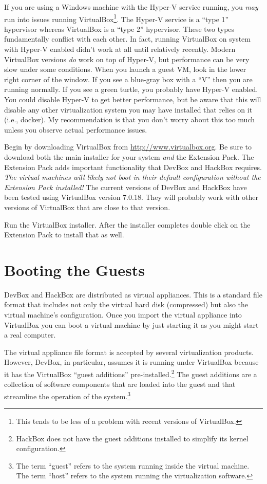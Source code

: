 \documentclass[twocolumn]{article}
\begin{document}
If you are using a Windows machine with the Hyper-V service running, you \emph{may} run into
issues running VirtualBox\footnote{This tends to be less of a problem with recent versions of
VirtualBox.}. The Hyper-V service is a ``type 1'' hypervisor whereas VirtualBox is a ``type 2''
hypervisor. These two types fundamentally conflict with each other. In fact, running VirtualBox
on system with Hyper-V enabled didn't work at all until relatively recently. Modern VirtualBox
versions \emph{do} work on top of Hyper-V, but performance can be very slow under some
conditions. When you launch a guest VM, look in the lower right corner of the window. If you see
a blue-gray box with a ``V'' then you are running normally. If you see a green turtle, you
probably have Hyper-V enabled. You could disable Hyper-V to get better performance, but be aware
that this will disable any other virtualization system you may have installed that relies on it
(i.e., docker). My recommendation is that you don't worry about this too much unless you observe
actual performance issues.

Begin by downloading VirtualBox from \url{http://www.virtualbox.org}. Be sure to download both
the main installer for your system \emph{and} the Extension Pack. The Extension Pack adds
important functionality that DevBox and HackBox requires. \emph{The virtual machines will likely
not boot in their default configuration without the Extension Pack installed!} The current
versions of DevBox and HackBox have been tested using VirtualBox version 7.0.18. They will
probably work with other versions of VirtualBox that are close to that version.

Run the VirtualBox installer. After the installer completes double click on the Extension Pack
to install that as well.

\section{Booting the Guests}
\label{sec:booting-guests}

DevBox and HackBox are distributed as virtual appliances. This is a standard file format that
includes not only the virtual hard disk (compressed) but also the virtual machine's
configuration. Once you import the virtual appliance into VirtualBox you can boot a virtual
machine by just starting it as you might start a real computer.

The virtual appliance file format is accepted by several virtualization products. However,
DevBox, in particular, assumes it is running under VirtualBox because it has the VirtualBox
``guest additions'' pre-installed.\footnote{HackBox does not have the guest additions installed
to simplify its kernel configuration.} The guest additions are a collection of software
components that are loaded into the guest and that streamline the operation of the
system.\footnote{The term ``guest'' refers to the system running inside the virtual machine. The
term ``host'' refers to the system running the virtualization software.}
\end{document}
